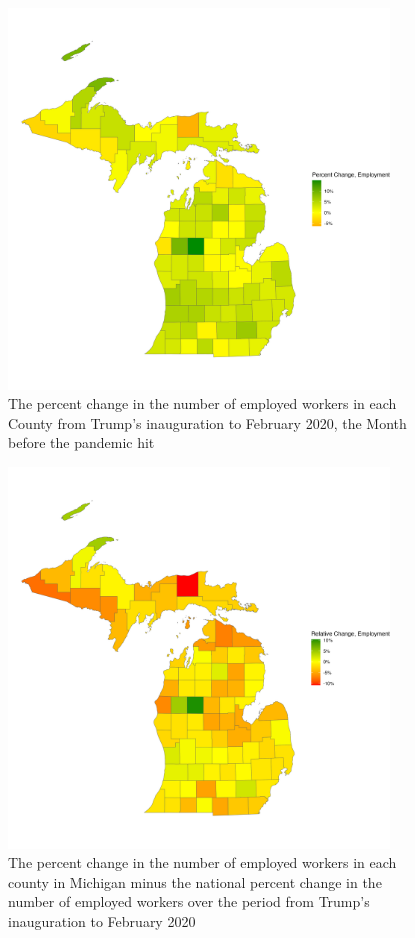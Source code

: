 \documentclass[11pt]{article}
\begin{document}
\begin{figure}
    \centering
    \includegraphics[width=0.9\textwidth]{plots/raw-employment-plot.png}
    \caption{The percent change in the number of employed workers in each County from Trump's inauguration to February 2020, the Month before the pandemic hit}
\end{figure}
\begin{figure}
    \centering
    \includegraphics[width=0.9\textwidth]{plots/relative-employment-plot.png}
    \caption{The percent change in the number of employed workers in each county in Michigan minus the national percent change in the number of employed workers over the period from Trump's inauguration to February 2020}
\end{figure}
\end{document}

